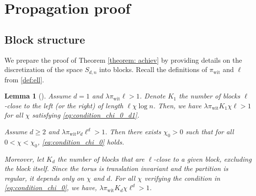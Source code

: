 \documentclass[11pt, a4paper]{amsart}
\newtheorem{lemma}[theorem]{Lemma}
\newcommand{\1}{\mathbf{1}}
\theoremstyle{definition}
\theoremstyle{remark}
\theoremstyle{definition}
\begin{document}
\section{Propagation proof}

\subsection{Block structure}
We prepare the proof of Theorem \ref{theorem: achiev} by providing details on the discretization of the space $S_{d,n}$ into blocks. Recall the definitions of $\pi_{\mathrm{wit}}$ and $\ell$ from \eqref{def:ell}.

\begin{lemma}[{\cite[Section C]{gaudio2025incguan}}]
\label{lemma:condition_chi_0}
Assume $d=1$ and $\lambda \pi_\mathrm{wit}\ell>1$. Denote $K_1$ the number of blocks $\ell$-close to the left (or the right)  of length $\ell\chi \log n$.
Then, we have  $\lambda \pi_{\mathrm{wit}}K_1 \chi \ell> 1$ for all $\chi$ satisfying \eqref{eq:condition_chi_0_d1}. 


Assume $d\geq 2$ and $\lambda \pi_{\mathrm{wit}} \nu_d \ell^d > 1$. Then there exists $\chi_0 > 0$ such that for all $0 <\chi < \chi_0$, \eqref{eq:condition_chi_0} holds.
   
    Moreover, let $K_d$ the number of blocks that are $\ell$-close to a given block, excluding the block itself. Since the torus is translation invariant and the partition is regular, it depends only on $\chi$ and $d$. For all $\chi$ verifying the condition in \eqref{eq:condition_chi_0}, we have, $\lambda \pi_{\mathrm{wit}} K_d\chi \ell^d > 1$.
\end{lemma}
\end{document}
